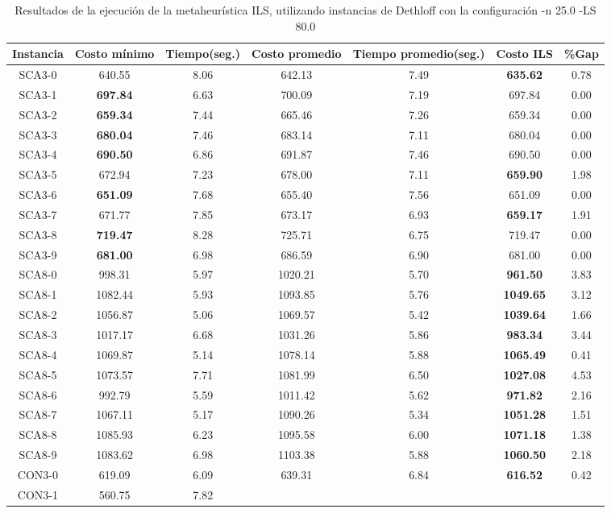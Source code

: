 \begin{table}[ht]
\caption{Resultados de la ejecución de la metaheurística ILS, utilizando instancias de Dethloff con la configuración -n 25.0 -LS 80.0}
\centering
\small
\begin{tabular}{c c c c c c c}
\hline\hline
Instancia & Costo mínimo & Tiempo(seg.) & Costo promedio & Tiempo promedio(seg.) & Costo ILS & \%Gap \\ [0.5ex]
\hline
SCA3-0 & 640.55 & 8.06 & 
642.13 & 7.49 & \bf{635.62} & 
0.78\\SCA3-1 & \bf{697.84} & 6.63 & 
700.09 & 7.19 & 697.84 & 0.00\\
SCA3-2 & \bf{659.34} & 7.44 & 
665.46 & 7.26 & 659.34 & 0.00\\
SCA3-3 & \bf{680.04} & 7.46 & 
683.14 & 7.11 & 680.04 & 0.00\\
SCA3-4 & \bf{690.50} & 6.86 & 
691.87 & 7.46 & 690.50 & 0.00\\
SCA3-5 & 672.94 & 7.23 & 
678.00 & 7.11 & \bf{659.90} & 
1.98\\SCA3-6 & \bf{651.09} & 7.68 & 
655.40 & 7.56 & 651.09 & 0.00\\
SCA3-7 & 671.77 & 7.85 & 
673.17 & 6.93 & \bf{659.17} & 
1.91\\SCA3-8 & \bf{719.47} & 8.28 & 
725.71 & 6.75 & 719.47 & 0.00\\
SCA3-9 & \bf{681.00} & 6.98 & 
686.59 & 6.90 & 681.00 & 0.00\\
SCA8-0 & 998.31 & 5.97 & 
1020.21 & 5.70 & \bf{961.50} & 
3.83\\SCA8-1 & 1082.44 & 5.93 & 
1093.85 & 5.76 & \bf{1049.65} & 
3.12\\SCA8-2 & 1056.87 & 5.06 & 
1069.57 & 5.42 & \bf{1039.64} & 
1.66\\SCA8-3 & 1017.17 & 6.68 & 
1031.26 & 5.86 & \bf{983.34} & 
3.44\\SCA8-4 & 1069.87 & 5.14 & 
1078.14 & 5.88 & \bf{1065.49} & 
0.41\\SCA8-5 & 1073.57 & 7.71 & 
1081.99 & 6.50 & \bf{1027.08} & 
4.53\\SCA8-6 & 992.79 & 5.59 & 
1011.42 & 5.62 & \bf{971.82} & 
2.16\\SCA8-7 & 1067.11 & 5.17 & 
1090.26 & 5.34 & \bf{1051.28} & 
1.51\\SCA8-8 & 1085.93 & 6.23 & 
1095.58 & 6.00 & \bf{1071.18} & 
1.38\\SCA8-9 & 1083.62 & 6.98 & 
1103.38 & 5.88 & \bf{1060.50} & 
2.18\\CON3-0 & 619.09 & 6.09 & 
639.31 & 6.84 & \bf{616.52} & 
0.42\\CON3-1 & 560.75 & 7.82 & 

\end{tabular}
\end{table}
